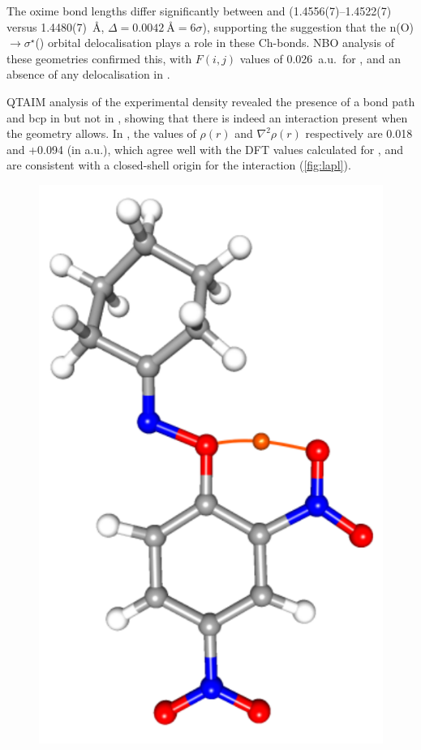 \begin{refsection}
The oxime bond lengths differ significantly between  and  (1.4556(7)--1.4522(7) versus 1.4480(7)~\AA, $\Delta = 0.0042~\text{\AA} = 6\sigma$), supporting the suggestion that the n(O)$\rightarrow \sigma^{\star}$() orbital delocalisation plays a role in these Ch-bonds.
NBO analysis of these geometries confirmed this, with $F(i,j)$ values of 0.026~a.u.\ for , and an absence of any delocalisation in .

QTAIM analysis of the experimental density revealed the presence of a bond path and bcp in  but not in , showing that there is indeed an interaction present when the geometry allows.
In , the values of $\rho(r)$ and $\nabla^{2}\rho(r)$ respectively are 0.018 and +0.094 (in a.u.), which agree well with the DFT values calculated for , and are consistent with a closed-shell origin for the interaction (\cref{fig:lapl}).

\begin{figure}
	\centering
	\includegraphics[width=0.3\columnwidth]{Figures/cyclohexanone-oxime-dnp-bcp.pdf}


\end{figure}
\end{refsection}
